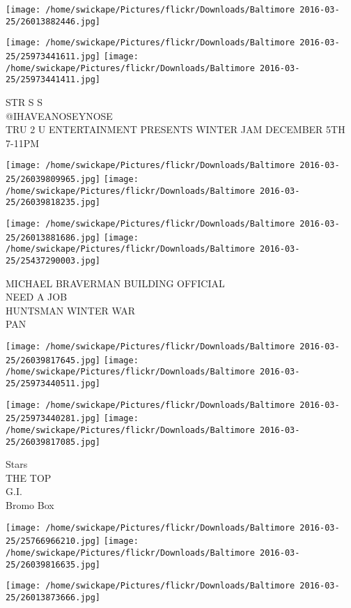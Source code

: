 \documentclass[10pt,letterpaper]{article}
\begin{document}
\texttt{[image: /home/swickape/Pictures/flickr/Downloads/Baltimore 2016-03-25/26013882446.jpg]}

\vspace{0.25in}
\texttt{[image: /home/swickape/Pictures/flickr/Downloads/Baltimore 2016-03-25/25973441611.jpg]}
\texttt{[image: /home/swickape/Pictures/flickr/Downloads/Baltimore 2016-03-25/25973441411.jpg]}

STR S S\\
@IHAVEANOSEYNOSE\\
TRU 2 U ENTERTAINMENT PRESENTS WINTER JAM DECEMBER 5TH 7{-}11PM
\pagebreak

\texttt{[image: /home/swickape/Pictures/flickr/Downloads/Baltimore 2016-03-25/26039809965.jpg]}
\texttt{[image: /home/swickape/Pictures/flickr/Downloads/Baltimore 2016-03-25/26039818235.jpg]}

\texttt{[image: /home/swickape/Pictures/flickr/Downloads/Baltimore 2016-03-25/26013881686.jpg]}
\texttt{[image: /home/swickape/Pictures/flickr/Downloads/Baltimore 2016-03-25/25437290003.jpg]}

MICHAEL BRAVERMAN BUILDING OFFICIAL\\
NEED A JOB\\
HUNTSMAN WINTER WAR\\
PAN
\pagebreak

\texttt{[image: /home/swickape/Pictures/flickr/Downloads/Baltimore 2016-03-25/26039817645.jpg]}
\texttt{[image: /home/swickape/Pictures/flickr/Downloads/Baltimore 2016-03-25/25973440511.jpg]}

\texttt{[image: /home/swickape/Pictures/flickr/Downloads/Baltimore 2016-03-25/25973440281.jpg]}
\texttt{[image: /home/swickape/Pictures/flickr/Downloads/Baltimore 2016-03-25/26039817085.jpg]}

Stars\\
THE TOP\\
G.I.\\
Bromo Box
\pagebreak

\texttt{[image: /home/swickape/Pictures/flickr/Downloads/Baltimore 2016-03-25/25766966210.jpg]}
\texttt{[image: /home/swickape/Pictures/flickr/Downloads/Baltimore 2016-03-25/26039816635.jpg]}

\vspace{0.25in}
\texttt{[image: /home/swickape/Pictures/flickr/Downloads/Baltimore 2016-03-25/26013873666.jpg]}
\end{document}
